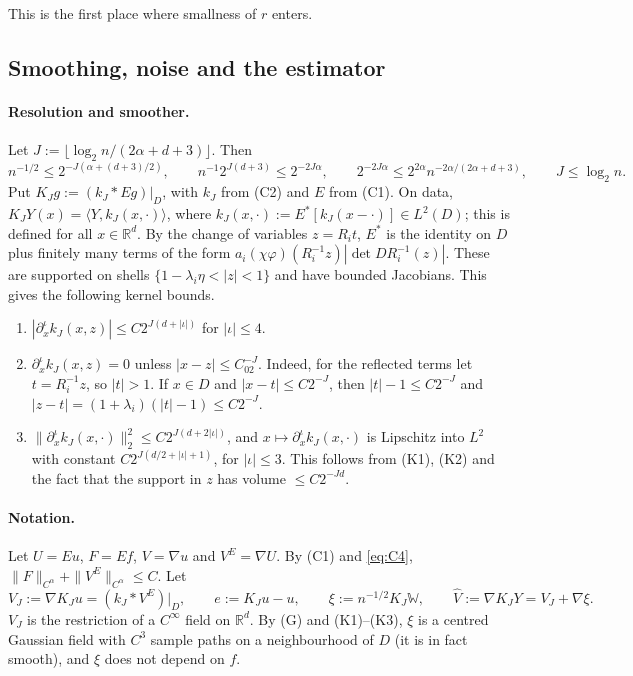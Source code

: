 \documentclass[11pt]{article}
\theoremstyle{definition}
\theoremstyle{remark}
\newcommand{\R}{\mathbb R}
\newcommand{\W}{\mathbb W}
\newcommand{\rate}{n^{-2\alpha/(2\alpha+d+3)}}
\begin{document}
This is the first place where smallness of $r$ enters.

\subsection{Smoothing, noise and the estimator}

\paragraph{Resolution and smoother.} Let $J:=\lfloor\log_2n/(2\alpha+d+3)\rfloor$. Then
\begin{equation}\label{eq:J}
n^{-1/2}\le2^{-J(\alpha+(d+3)/2)},\qquad n^{-1}2^{J(d+3)}\le2^{-2J\alpha},\qquad 2^{-2J\alpha}\le 2^{2\alpha}\rate,\qquad J\le\log_2n .
\end{equation}
Put $K_Jg:=(k_J*Eg)|_D$, with $k_J$ from (C2) and $E$ from (C1). On data, $K_JY(x)=\langle Y,k_J(x,\cdot)\rangle$, where $k_J(x,\cdot):=E^*[k_J(x-\cdot)]\in L^2(D)$; this is defined for all $x\in\R^d$. By the change of variables $z=R_it$, $E^*$ is the identity on $D$ plus finitely many terms of the form $a_i(\chi\varphi)(R_i^{-1}z)|\det DR_i^{-1}(z)|$. These are supported on shells $\{1-\lambda_i\eta<|z|<1\}$ and have bounded Jacobians. This gives the following kernel bounds.
\begin{enumerate}[leftmargin=3.2em]
\item[\textbf{(K1)}] $|\partial^\iota_xk_J(x,z)|\le C2^{J(d+|\iota|)}$ for $|\iota|\le4$.
\item[\textbf{(K2)}] $\partial^\iota_xk_J(x,z)=0$ unless $|x-z|\le C_02^{-J}$. Indeed, for the reflected terms let $t=R_i^{-1}z$, so $|t|>1$. If $x\in D$ and $|x-t|\le C2^{-J}$, then $|t|-1\le C2^{-J}$ and $|z-t|=(1+\lambda_i)(|t|-1)\le C2^{-J}$.
\item[\textbf{(K3)}] $\|\partial^\iota_xk_J(x,\cdot)\|^2_2\le C2^{J(d+2|\iota|)}$, and $x\mapsto\partial_x^\iota k_J(x,\cdot)$ is Lipschitz into $L^2$ with constant $C2^{J(d/2+|\iota|+1)}$, for $|\iota|\le3$. This follows from (K1), (K2) and the fact that the support in $z$ has volume $\le C2^{-Jd}$.
\end{enumerate}

\paragraph{Notation.} Let $U=Eu$, $F=Ef$, $V=\nabla u$ and $V^E=\nabla U$. By (C1) and \eqref{eq:C4}, $\|F\|_{C^\alpha}+\|V^E\|_{C^\alpha}\le C$. Let
\[
V_J:=\nabla K_Ju=(k_J*V^E)|_D,\qquad e:=K_Ju-u,\qquad \xi:=n^{-1/2}K_J\W,\qquad\hat V:=\nabla K_JY=V_J+\nabla\xi .
\]
$V_J$ is the restriction of a $C^\infty$ field on $\R^d$. By (G) and (K1)--(K3), $\xi$ is a centred Gaussian field with $C^3$ sample paths on a neighbourhood of $D$ (it is in fact smooth), and $\xi$ does not depend on $f$.
\end{document}
